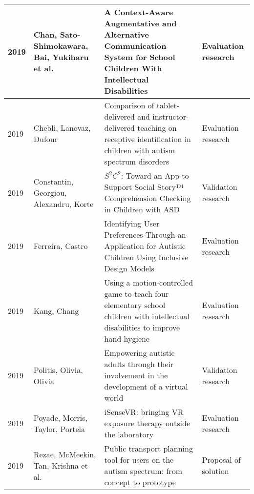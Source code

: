 \documentclass[utf8,english]{gradu3}
\begin{document}
\begin{longtable}{|>{\scriptsize}l|>{\scriptsize}p{3cm}|>{\scriptsize}p{8cm}|>{\scriptsize}p{2.4cm}|}
  2019          & Chan, Sato-Shimokawara, Bai, Yukiharu et al.                         & A Context-Aware Augmentative and Alternative Communication System for School Children With Intellectual Disabilities                                                                         & Evaluation research        \\ \hline
  2019          & Chebli, Lanovaz, Dufour                                              & Comparison of tablet-delivered and instructor-delivered teaching on receptive identification in children with autism spectrum disorders                                                      & Evaluation research        \\ \hline
  2019          & Constantin, Georgiou, Alexandru, Korte                               & $S^2C^2$: Toward an App to Support Social Story™ Comprehension Checking in Children with ASD                                                                                                 & Validation research        \\ \hline
  2019          & Ferreira, Castro                                                     & Identifying User Preferences Through an Application for Autistic Children Using Inclusive Design Models                                                                                      & Evaluation research        \\ \hline
  2019          & Kang, Chang                                                          & Using a motion-controlled game to teach four elementary school children with intellectual disabilities to improve hand hygiene                                                               & Evaluation research        \\ \hline
  2019          & Politis, Olivia, Olivia                                              & Empowering autistic adults through their involvement in the development of a virtual world                                                                                                   & Validation research        \\ \hline
  2019          & Poyade, Morris, Taylor, Portela                                      & iSenseVR: bringing VR exposure therapy outside the laboratory                                                                                                                                & Evaluation research        \\ \hline
  2019          & Rezae, McMeekin, Tan, Krishna et al.                                 & Public transport planning tool for users on the autism spectrum: from concept to prototype                                                                                                   & Proposal of solution       \\ \hline

\end{longtable}
\end{document}
